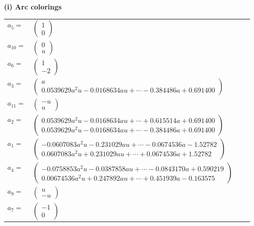 \documentclass[1p]{elsarticle_modified}
\theoremstyle{definition}
\begin{document}
\flushleft \textbf{(i) Arc colorings}\\
\begin{tabular}{m{7pt} m{180pt} m{7pt} m{180pt} }
\flushright $a_{5}=$&$\begin{pmatrix}1\\0\end{pmatrix}$ \\
\flushright $a_{10}=$&$\begin{pmatrix}0\\u\end{pmatrix}$ \\
\flushright $a_{6}=$&$\begin{pmatrix}1\\-2\end{pmatrix}$ \\
\flushright $a_{3}=$&$\begin{pmatrix}a\\0.0539629 a^{2} u-0.0168634 a u+\cdots-0.384486 a+0.691400\end{pmatrix}$ \\
\flushright $a_{11}=$&$\begin{pmatrix}- u\\u\end{pmatrix}$ \\
\flushright $a_{2}=$&$\begin{pmatrix}0.0539629 a^{2} u-0.0168634 a u+\cdots+0.615514 a+0.691400\\0.0539629 a^{2} u-0.0168634 a u+\cdots-0.384486 a+0.691400\end{pmatrix}$ \\
\flushright $a_{1}=$&$\begin{pmatrix}-0.0607083 a^{2} u-0.231029 a u+\cdots-0.0674536 a-1.52782\\0.0607083 a^{2} u+0.231029 a u+\cdots+0.0674536 a+1.52782\end{pmatrix}$ \\
\flushright $a_{4}=$&$\begin{pmatrix}-0.0758853 a^{2} u-0.0387858 a u+\cdots-0.0843170 a+0.590219\\0.00674536 a^{2} u+0.247892 a u+\cdots+0.451939 a-0.163575\end{pmatrix}$ \\
\flushright $a_{9}=$&$\begin{pmatrix}u\\- u\end{pmatrix}$ \\
\flushright $a_{7}=$&$\begin{pmatrix}-1\\0\end{pmatrix}$ \\

\end{tabular}
\end{document}
